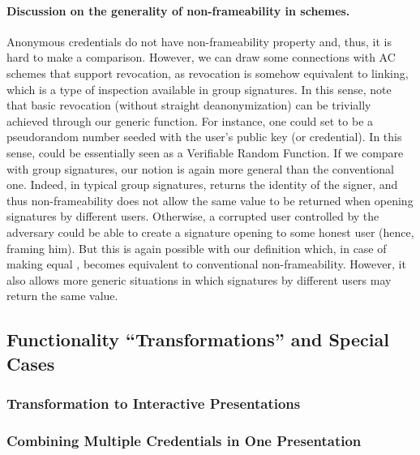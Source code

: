 \paragraph{Discussion on the generality of non-frameability in \UAS schemes.} %
Anonymous credentials do not have non-frameability property and, thus, it is
hard to make a comparison. However, we can draw some connections with AC schemes
that support revocation, as revocation is somehow equivalent to linking, which
is a type of inspection available in group signatures. In this sense, note that
basic revocation (without straight deanonymization) can be trivially achieved
through our generic \Inspect function. For instance, one could set \finsp to
be a pseudorandom number seeded with the user's public key (or credential). In
this sense, \Inspect could be essentially seen as a Verifiable Random Function.
If we compare with group signatures, our notion is again more general than the
conventional one. Indeed, in typical group signatures, \Open returns the
identity of the signer, and thus non-frameability does not allow the same value
to be returned when opening signatures by different users. Otherwise, a
corrupted user controlled by the adversary could be able to create a signature
opening to some honest user (hence, framing him). But this is again possible
with our definition which, in case of making \Inspect equal \Open, becomes
equivalent to conventional non-frameability. However, it also allows more
generic situations in which signatures by different users may return the same
value. 

\subsection{Functionality ``Transformations'' and Special Cases}
\label{ssec:transformations}


\subsubsection{Transformation to Interactive Presentations}
\label{sssec:interactivetransform}


\subsubsection{Combining Multiple Credentials in One Presentation}

